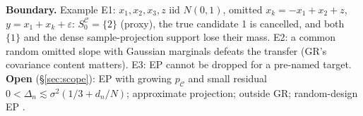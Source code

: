 \textbf{Boundary.} Example E1: $x_1,x_2,x_3,z$ iid $N(0,1)$, omitted $x_k=-x_1+x_2+z$, $y=x_1+x_k+\varepsilon$: $S_0^{\mathcal C}=\{2\}$ (proxy), the true candidate 1 is cancelled, and both $\{1\}$ and the dense sample-projection support lose their mass. E2: a common random omitted slope with Gaussian marginals defeats the transfer (GR's covariance content matters). E3: EP cannot be dropped for a pre-named target. \textbf{Open} (§\ref{sec:scope}): EP with growing $p_{\mathcal C}$ and small residual $0<\Delta_n\lesssim\sigma^2(1/3+d_n/N)$; approximate projection; outside GR; random-design EP .
